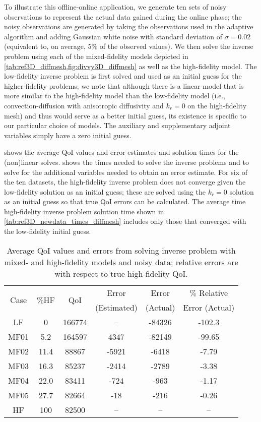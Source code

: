To illustrate this offline-online application, we generate ten sets of noisy observations to represent the actual data gained during the online phase; the noisy observations are generated by taking the observations used in the adaptive algorithm and adding Gaussian white noise with standard deviation of $\sigma=0.02$ (equivalent to, on average, $5\%$ of the observed values). We then solve the inverse problem using each of the mixed-fidelity models depicted in \cref{tab:ref3D_diffmesh,fig:divvy3D_diffmesh} as well as the high-fidelity model. The low-fidelity inverse problem is first solved and used as an initial guess for the higher-fidelity problems; we note that although there is a linear model that is more similar to the high-fidelity model than the low-fidelity model (i.e., convection-diffusion with anisotropic diffusivity and $k_r=0$ on the high-fidelity mesh) and thus would serve as a better initial guess, its existence is specific to our particular choice of models. The auxiliary and supplementary adjoint variables simply have a zero initial guess. 

 shows the average QoI values and error estimates and solution times for the (non)linear solves.  shows the times needed to solve the inverse problems and to solve for the additional variables needed to obtain an error estimate. For six of the ten datasets, the high-fidelity inverse problem does not converge given the low-fidelity solution as an initial guess; these are solved using the $k_r=0$ solution as an initial guess so that true QoI errors can be calculated. The average time high-fidelity inverse problem solution time shown in \cref{tab:ref3D_newdata_times_diffmesh} includes only those that converged with the low-fidelity initial guess.  
%
\begin{table}
\caption{Average QoI values and errors from solving inverse problem with mixed- and high-fidelity models and noisy data; relative errors are with respect to true high-fidelity QoI.}
\label{tab:ref3D_newdata_QoI_diffmesh}
\centering
\begin{tabular}{|c|c|c|c|c|c|}
\hline
\multirow{2}{*}{Case} & \multirow{2}{*}{$\%$HF} & \multirow{2}{*}{QoI} & Error & Error & $\%$ Relative  \\ 
& & & (Estimated) & (Actual) & Error (Actual) \\ \hline
LF   & 0    & 166774 & --    & -84326 & -102.3 \\
MF01 & 5.2  & 164597 & 4347  & -82149 & -99.65  \\
MF02 & 11.4 & 88867  & -5921 & -6418  & -7.79  \\
MF03 & 16.3 & 85237  & -2414 & -2789  & -3.38  \\
MF04 & 22.0 & 83411  & -724  & -963   & -1.17  \\
MF05 & 27.7 & 82664  & -18   & -216   & -0.26 \\
HF   & 100  & 82500  & --    & --     & --  \\ \hline
\end{tabular}
\end{table}

